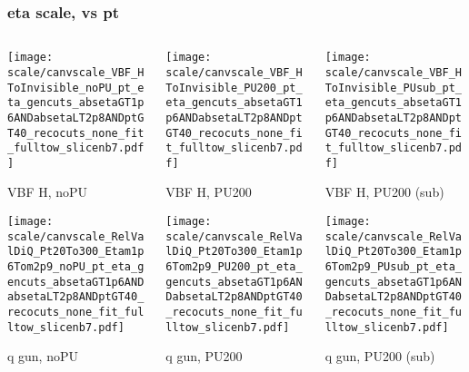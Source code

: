 \documentclass[8pt]{beamer}
\begin{document}
  \begin{frame}
  \frametitle{eta scale, vs pt}
  
  \begin{columns}
   \begin{column}{0.35\textwidth}
     \texttt{[image: scale/canvscale\_VBF\_HToInvisible\_noPU\_pt\_eta\_gencuts\_absetaGT1p6ANDabsetaLT2p8ANDptGT40\_recocuts\_none\_fit\_fulltow\_slicenb7.pdf]}
     
     VBF H, noPU
    
     \texttt{[image: scale/canvscale\_RelValDiQ\_Pt20To300\_Etam1p6Tom2p9\_noPU\_pt\_eta\_gencuts\_absetaGT1p6ANDabsetaLT2p8ANDptGT40\_recocuts\_none\_fit\_fulltow\_slicenb7.pdf]}
     
     q gun, noPU
   \end{column}
   \begin{column}{0.35\textwidth}
     \texttt{[image: scale/canvscale\_VBF\_HToInvisible\_PU200\_pt\_eta\_gencuts\_absetaGT1p6ANDabsetaLT2p8ANDptGT40\_recocuts\_none\_fit\_fulltow\_slicenb7.pdf]}
     
     VBF H, PU200
    
     \texttt{[image: scale/canvscale\_RelValDiQ\_Pt20To300\_Etam1p6Tom2p9\_PU200\_pt\_eta\_gencuts\_absetaGT1p6ANDabsetaLT2p8ANDptGT40\_recocuts\_none\_fit\_fulltow\_slicenb7.pdf]}
     
     q gun, PU200
   \end{column}
   \begin{column}{0.35\textwidth}
     \texttt{[image: scale/canvscale\_VBF\_HToInvisible\_PUsub\_pt\_eta\_gencuts\_absetaGT1p6ANDabsetaLT2p8ANDptGT40\_recocuts\_none\_fit\_fulltow\_slicenb7.pdf]}
     
     VBF H, PU200 (sub)
    
     \texttt{[image: scale/canvscale\_RelValDiQ\_Pt20To300\_Etam1p6Tom2p9\_PUsub\_pt\_eta\_gencuts\_absetaGT1p6ANDabsetaLT2p8ANDptGT40\_recocuts\_none\_fit\_fulltow\_slicenb7.pdf]}
     
     q gun, PU200 (sub)
   \end{column}
  \end{columns}
 \end{frame}
 
\end{document}
